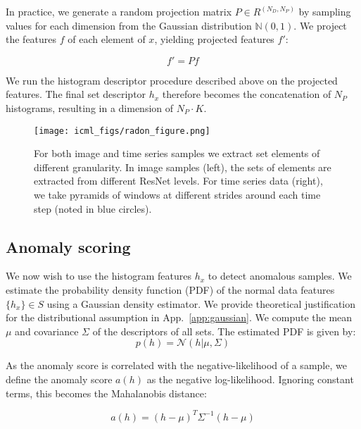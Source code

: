 \documentclass{article}
\begin{document}
In practice, we generate a random projection matrix $P \in R^{(N_D,N_P)}$ by sampling values for each dimension from the Gaussian distribution $\mathbb{N}(0, 1)$. We project the features $f$ of each element of $x$, yielding projected features $f'$:

\begin{equation}
    f' = Pf
\end{equation}

We run the histogram descriptor procedure described above on the projected features. The final set descriptor $h_x$ therefore becomes the concatenation of $N_P$ histograms, resulting in a dimension of $N_P \cdot K$.





\begin{figure*}
  \centering
  \texttt{[image: icml\_figs/radon\_figure.png]}

  \caption{ For both image and time series samples we extract set elements of different granularity. In image samples (left), the sets of elements are extracted from different ResNet levels. For time series data (right), we take pyramids of windows at different strides around each time step (noted in blue circles).}
  \label{fig:elemnts}
  \vspace{5pt}
\end{figure*}


\subsection{Anomaly scoring}
\label{sec:anomaly_scoring}
We now wish to use the histogram features $h_x$ to detect anomalous samples. We estimate the probability density function (PDF) of the normal data features $\{h_x\} \in S$ using a Gaussian density estimator. We provide theoretical justification for the distributional assumption in App.~\ref{app:gaussian}.  We compute the mean $\mu$ and covariance $\Sigma$ of the descriptors of all sets. The estimated PDF is given by:
\begin{equation}
    p(h) = \mathcal{N}(h|\mu, \Sigma)
\end{equation}

As the anomaly score is correlated with the negative-likelihood of a sample, we define the anomaly score $a(h)$ as the negative log-likelihood. Ignoring constant terms, this becomes the Mahalanobis distance:

\begin{equation}
    a(h) = (h - \mu)^T \Sigma^{-1} (h - \mu)
\end{equation}
\end{document}
